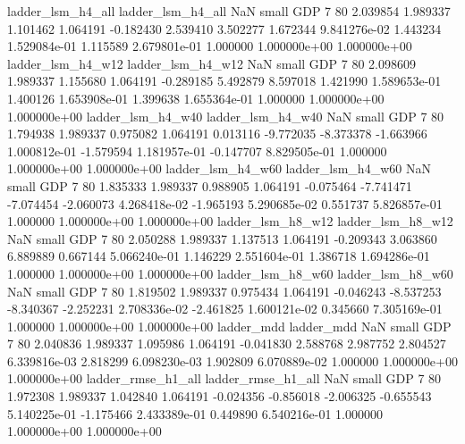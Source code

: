        ladder_lsm_h4_all        ladder_lsm_h4_all                   NaN      small      GDP                 7 80 2.039854       1.989337 1.101462       1.064191   -0.182430      2.539410      3.502277     1.672344   9.841276e-02  1.443234 1.529084e-01     1.115589   2.679801e-01            1.000000    1.000000e+00        1.000000e+00
       ladder_lsm_h4_w12        ladder_lsm_h4_w12                   NaN      small      GDP                 7 80 2.098609       1.989337 1.155680       1.064191   -0.289185      5.492879      8.597018     1.421990   1.589653e-01  1.400126 1.653908e-01     1.399638   1.655364e-01            1.000000    1.000000e+00        1.000000e+00
       ladder_lsm_h4_w40        ladder_lsm_h4_w40                   NaN      small      GDP                 7 80 1.794938       1.989337 0.975082       1.064191    0.013116     -9.772035     -8.373378    -1.663966   1.000812e-01 -1.579594 1.181957e-01    -0.147707   8.829505e-01            1.000000    1.000000e+00        1.000000e+00
       ladder_lsm_h4_w60        ladder_lsm_h4_w60                   NaN      small      GDP                 7 80 1.835333       1.989337 0.988905       1.064191   -0.075464     -7.741471     -7.074454    -2.060073   4.268418e-02 -1.965193 5.290685e-02     0.551737   5.826857e-01            1.000000    1.000000e+00        1.000000e+00
       ladder_lsm_h8_w12        ladder_lsm_h8_w12                   NaN      small      GDP                 7 80 2.050288       1.989337 1.137513       1.064191   -0.209343      3.063860      6.889889     0.667144   5.066240e-01  1.146229 2.551604e-01     1.386718   1.694286e-01            1.000000    1.000000e+00        1.000000e+00
       ladder_lsm_h8_w60        ladder_lsm_h8_w60                   NaN      small      GDP                 7 80 1.819502       1.989337 0.975434       1.064191   -0.046243     -8.537253     -8.340367    -2.252231   2.708336e-02 -2.461825 1.600121e-02     0.345660   7.305169e-01            1.000000    1.000000e+00        1.000000e+00
              ladder_mdd               ladder_mdd                   NaN      small      GDP                 7 80 2.040836       1.989337 1.095986       1.064191   -0.041830      2.588768      2.987752     2.804527   6.339816e-03  2.818299 6.098230e-03     1.902809   6.070889e-02            1.000000    1.000000e+00        1.000000e+00
      ladder_rmse_h1_all       ladder_rmse_h1_all                   NaN      small      GDP                 7 80 1.972308       1.989337 1.042840       1.064191   -0.024356     -0.856018     -2.006325    -0.655543   5.140225e-01 -1.175466 2.433389e-01     0.449890   6.540216e-01            1.000000    1.000000e+00        1.000000e+00
